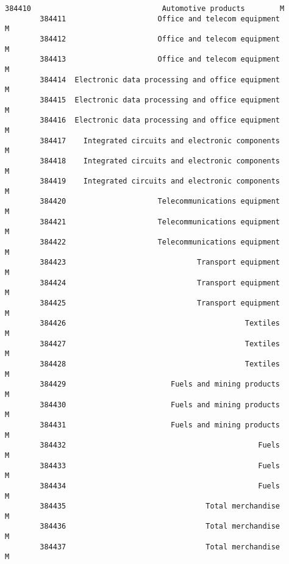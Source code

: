 \documentclass[11pt]{article}
\begin{document}
\begin{Verbatim}[commandchars=\\\{\}]
        384410                              Automotive products        M    
        384411                     Office and telecom equipment        M    
        384412                     Office and telecom equipment        M    
        384413                     Office and telecom equipment        M    
        384414  Electronic data processing and office equipment        M    
        384415  Electronic data processing and office equipment        M    
        384416  Electronic data processing and office equipment        M    
        384417    Integrated circuits and electronic components        M    
        384418    Integrated circuits and electronic components        M    
        384419    Integrated circuits and electronic components        M    
        384420                     Telecommunications equipment        M    
        384421                     Telecommunications equipment        M    
        384422                     Telecommunications equipment        M    
        384423                              Transport equipment        M    
        384424                              Transport equipment        M    
        384425                              Transport equipment        M    
        384426                                         Textiles        M    
        384427                                         Textiles        M    
        384428                                         Textiles        M    
        384429                        Fuels and mining products        M    
        384430                        Fuels and mining products        M    
        384431                        Fuels and mining products        M    
        384432                                            Fuels        M    
        384433                                            Fuels        M    
        384434                                            Fuels        M    
        384435                                Total merchandise        M    
        384436                                Total merchandise        M    
        384437                                Total merchandise        M    
        

\end{Verbatim}
\end{document}

